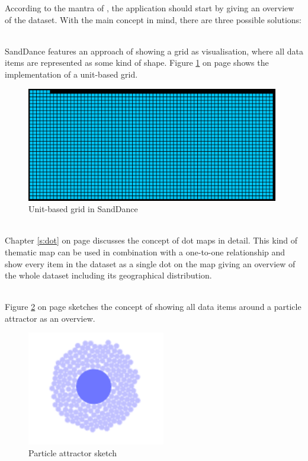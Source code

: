 According to the mantra of \citeauthor{Shneiderman1996}, the application should start by giving an overview of the dataset. With the main concept in mind, there are three possible solutions:
\begin{enumerate}

 \hfill \\
SandDance features an approach of showing a grid as visualisation, where all data items are represented as some kind of shape. Figure \ref{fig:sanddance-grid} on page \pageref{fig:sanddance-grid} shows the implementation of a unit-based grid.

\begin{figure}[!htb]
\centering
\includegraphics[height=5cm]{images/methods/related/sanddance-grid.png}
\caption[
    Unit-based grid in SandDance.
]{Unit-based grid in SandDance}
\label{fig:sanddance-grid}
\end{figure}
 \hfill \\
Chapter \ref{s:dot} on page \pageref{s:dot} discusses the concept of dot maps in detail. This kind of thematic map can be used in combination with a one-to-one relationship and show every item in the dataset as a single dot on the map giving an overview of the whole dataset including its geographical distribution.

 \hfill \\
Figure \ref{fig:particle-attractor} on page \pageref{fig:particle-attractor} sketches the concept of showing all data items around a particle attractor as an overview.

\begin{figure}[!htb]
\centering
\includegraphics[height=5cm]{images/methods/related/particle-attractor.png}
\caption[
    Particle attractor sketch.
]{Particle attractor sketch}
\label{fig:particle-attractor}
\end{figure}

\end{enumerate}


